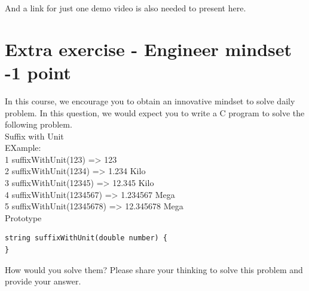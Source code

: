 \begin{center}
\end{center}


And a link for just one demo video is also needed to present here.


\begin{center}
\end{center}

  

\section{Extra exercise - Engineer mindset -1 point}
In this course, we encourage you to obtain an innovative mindset to solve daily problem. In this question, we would expect you to write a C program to solve the following problem. \\

Suffix with Unit\\

EXample:\\

1 suffixWithUnit(123) => 123\\

2 suffixWithUnit(1234) => 1.234 Kilo\\

3 suffixWithUnit(12345) => 12.345 Kilo\\

4 suffixWithUnit(1234567) => 1.234567 Mega\\

5 suffixWithUnit(12345678) => 12.345678 Mega\\


Prototype
\begin{lstlisting}
string suffixWithUnit(double number) {
}
\end{lstlisting}

How would you solve them? Please share your thinking to solve this problem and provide your answer.  


